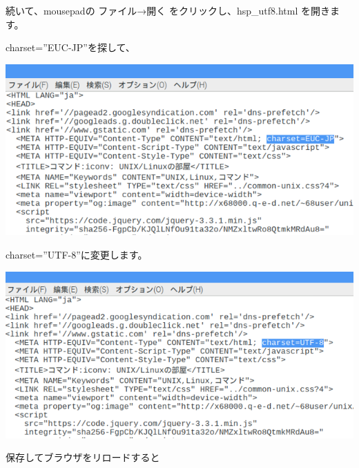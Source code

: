 



続いて、mousepadの
ファイル→開く
をクリックし、hsp\_utf8.html を開きます。


charset=”EUC-JP”を探して、



\begin{center}
\includegraphics[width=\textwidth]{./text08-img/textbook-img025.png}

\end{center}
charset=”UTF-8”に変更します。



\begin{center}
\includegraphics[width=\textwidth]{./text08-img/textbook-img026.png}

\end{center}

\clearpage

保存してブラウザをリロードすると



